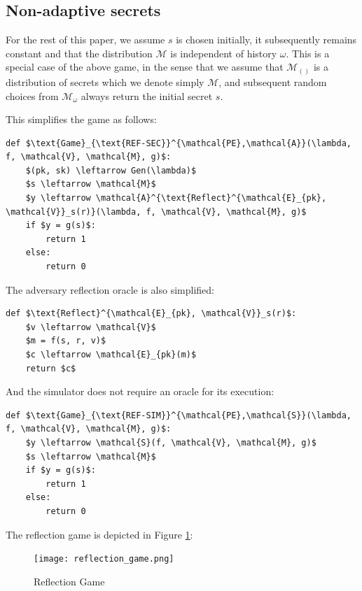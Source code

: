 \documentclass[conference, letterpaper, 10pt]{IEEEtran}
\begin{document}
\subsection{Non-adaptive secrets}\label{subsec:refsecnonadapt}

For the rest of this paper, we assume $s$ is chosen initially, it subsequently
remains constant and that the distribution $\mathcal{M}$ is independent of
history $\omega$. This is a special case of the above game, in the sense that we
assume that $\mathcal{M}_{()}$ is a distribution of secrets which we denote
simply $\mathcal{M}$, and subsequent random choices from $\mathcal{M}_\omega$
always return the initial secret $s$.

This simplifies the game as follows:

\begin{lstlisting}[texcl,mathescape,basicstyle=\small]
def $\text{Game}_{\text{REF-SEC}}^{\mathcal{PE},\mathcal{A}}(\lambda, f, \mathcal{V}, \mathcal{M}, g)$:
    $(pk, sk) \leftarrow Gen(\lambda)$
    $s \leftarrow \mathcal{M}$
    $y \leftarrow \mathcal{A}^{\text{Reflect}^{\mathcal{E}_{pk}, \mathcal{V}}_s(r)}(\lambda, f, \mathcal{V}, \mathcal{M}, g)$
    if $y = g(s)$:
        return 1
    else:
        return 0
\end{lstlisting}

The adversary reflection oracle is also simplified:

\begin{lstlisting}[texcl,mathescape,basicstyle=\small]
def $\text{Reflect}^{\mathcal{E}_{pk}, \mathcal{V}}_s(r)$:
    $v \leftarrow \mathcal{V}$
    $m = f(s, r, v)$
    $c \leftarrow \mathcal{E}_{pk}(m)$
    return $c$
\end{lstlisting}

And the simulator does not require an oracle for its execution:

\begin{lstlisting}[texcl,mathescape,basicstyle=\small]
def $\text{Game}_{\text{REF-SIM}}^{\mathcal{PE},\mathcal{S}}(\lambda, f, \mathcal{V}, \mathcal{M}, g)$:
    $y \leftarrow \mathcal{S}(f, \mathcal{V}, \mathcal{M}, g)$
    $s \leftarrow \mathcal{M}$
    if $y = g(s)$:
        return 1
    else:
        return 0
\end{lstlisting}

The reflection game is depicted in Figure \ref{fig:refgame}:

    \begin{figure}[thpb]
        \centering
            \texttt{[image: reflection\_game.png]}
        \caption{Reflection Game}
        \label{fig:refgame}
    \end{figure}
\end{document}
